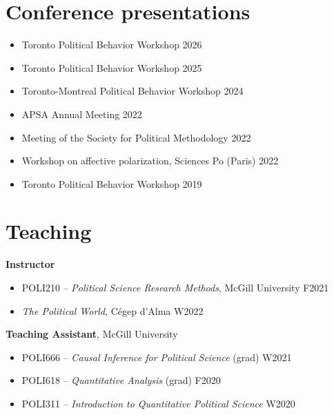 \documentclass[margin, 10pt]{res}
\begin{document}
\begin{resume}
\section{Conference presentations}
\begin{itemize}
		\item Toronto Political Behavior Workshop \hspace*{0pt}\hfill 2026
	\item Toronto Political Behavior Workshop \hspace*{0pt}\hfill 2025
	\item Toronto-Montreal Political Behavior Workshop \hspace*{0pt}\hfill 2024
	\item APSA Annual Meeting \hspace*{0pt}\hfill 2022
	\item Meeting of the Society for Political Methodology \hspace*{0pt}\hfill 2022
	\item Workshop on affective polarization, Sciences Po (Paris) \hspace*{0pt}\hfill 2022
	\item Toronto Political Behavior Workshop \hspace*{0pt}\hfill 2019
\end{itemize}

\newpage
\section{Teaching}

\textbf{Instructor}
\begin{itemize}
	\item POLI210 -- \textit{Political Science Research Methods}, McGill University \hspace*{0pt}\hfill F2021
	\item \textit{The Political World}, Cégep d'Alma \hspace*{0pt}\hfill W2022
\end{itemize}

\textbf{Teaching Assistant}, McGill University
\begin{itemize}
	\item POLI666 -- \textit{Causal Inference for Political Science} (grad) \hspace*{0pt}\hfill W2021
	\item POLI618 -- \textit{Quantitative Analysis} (grad) \hspace*{0pt}\hfill F2020
	\item POLI311 -- \textit{Introduction to Quantitative Political Science} \hspace*{0pt}\hfill W2020
\end{itemize}


\end{resume}
\end{document}
